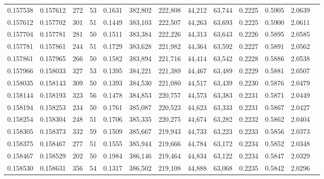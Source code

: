 \begin{tabular}{rrrrrrrrrrrrr}
0.157538 & 0.157612 &   272 &  53 &                                     0.1631 & 382,802 & 222,808 &  44,212 &  63,744 & 0.2225 & 0.5905 & 2.0639 \\
0.157612 & 0.157702 &   301 &  51 &                                     0.1449 & 383,103 & 222,507 &  44,263 &  63,693 & 0.2225 & 0.5900 & 2.0611 \\
0.157704 & 0.157781 &   281 &  50 &                                     0.1511 & 383,384 & 222,226 &  44,313 &  63,643 & 0.2226 & 0.5895 & 2.0585 \\
0.157781 & 0.157861 &   244 &  51 &                                     0.1729 & 383,628 & 221,982 &  44,364 &  63,592 & 0.2227 & 0.5891 & 2.0562 \\
0.157861 & 0.157965 &   266 &  50 &                                     0.1582 & 383,894 & 221,716 &  44,414 &  63,542 & 0.2228 & 0.5886 & 2.0538 \\
0.157966 & 0.158033 &   327 &  53 &                                     0.1395 & 384,221 & 221,389 &  44,467 &  63,489 & 0.2229 & 0.5881 & 2.0507 \\
0.158035 & 0.158143 &   309 &  50 &                                     0.1393 & 384,530 & 221,080 &  44,517 &  63,439 & 0.2230 & 0.5876 & 2.0479 \\
0.158144 & 0.158193 &   323 &  56 &                                     0.1478 & 384,853 & 220,757 &  44,573 &  63,383 & 0.2231 & 0.5871 & 2.0449 \\
0.158194 & 0.158253 &   234 &  50 &                                     0.1761 & 385,087 & 220,523 &  44,623 &  63,333 & 0.2231 & 0.5867 & 2.0427 \\
0.158254 & 0.158304 &   248 &  51 &                                     0.1706 & 385,335 & 220,275 &  44,674 &  63,282 & 0.2232 & 0.5862 & 2.0404 \\
0.158305 & 0.158373 &   332 &  59 &                                     0.1509 & 385,667 & 219,943 &  44,733 &  63,223 & 0.2233 & 0.5856 & 2.0373 \\
0.158375 & 0.158467 &   277 &  51 &                                     0.1555 & 385,944 & 219,666 &  44,784 &  63,172 & 0.2234 & 0.5852 & 2.0348 \\
0.158467 & 0.158529 &   202 &  50 &                                     0.1984 & 386,146 & 219,464 &  44,834 &  63,122 & 0.2234 & 0.5847 & 2.0329 \\
0.158530 & 0.158631 &   356 &  54 &                                     0.1317 & 386,502 & 219,108 &  44,888 &  63,068 & 0.2235 & 0.5842 & 2.0296 \\

\end{tabular}

